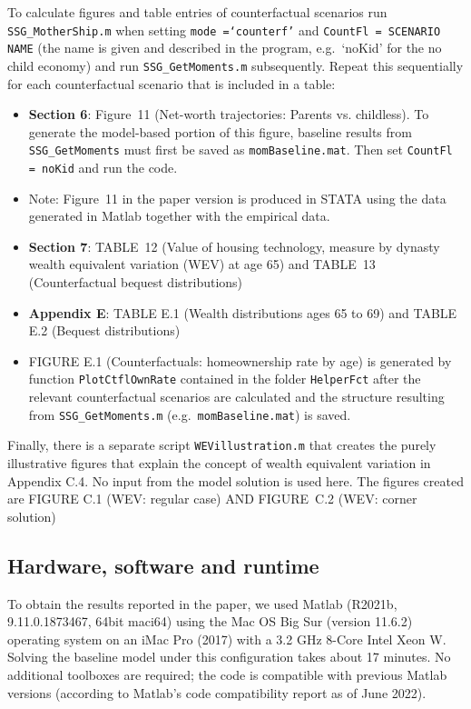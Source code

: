 \documentclass[a4,12p]{article}
\begin{document}
To calculate figures and table entries of counterfactual scenarios run \texttt{SSG\_MotherShip.m} when setting \texttt{mode =`counterf'} and \texttt{CountFl = SCENARIO NAME} (the name is given and described in the program, e.g.~`noKid' for the no child economy) and run \texttt{SSG\_GetMoments.m} subsequently. Repeat this sequentially for each counterfactual scenario that is included in a table:

\begin{itemize}
\item \textbf{Section 6}: Figure~11 (Net-worth trajectories: Parents vs. childless). To generate the model-based portion of this figure, baseline results from \texttt{SSG\_GetMoments} must first be saved as \texttt{momBaseline.mat}. Then set \texttt{CountFl = noKid} and run the code.
\item[] Note: Figure~11 in the paper version is produced in STATA using the data generated in Matlab together with the empirical data.

\item \textbf{Section 7}: TABLE~12 (Value of housing technology, measure by dynasty wealth equivalent variation (WEV) at age 65) and TABLE~13 (Counterfactual bequest distributions)

\item \textbf{Appendix E}: TABLE E.1 (Wealth distributions ages 65 to 69) and TABLE E.2 (Bequest distributions)
\item[] FIGURE E.1 (Counterfactuals: homeownership rate by age) is generated by function \texttt{PlotCtflOwnRate} contained in the folder \texttt{HelperFct} after the relevant counterfactual scenarios are calculated and the structure resulting from \texttt{SSG\_GetMoments.m} (e.g.\ \texttt{momBaseline.mat}) is saved.
	\end{itemize} 

Finally, there is a separate script {\tt WEVillustration.m} that creates the purely illustrative figures that explain the concept of wealth equivalent variation in Appendix C.4. No input from the model solution is used here. 
The figures created are FIGURE C.1 (WEV: regular case) AND FIGURE~C.2 (WEV: corner solution)


\subsection{Hardware, software and runtime}
\label{sec:hardw-softw-used}

To obtain the results reported in the paper, we used Matlab (R2021b,
9.11.0.1873467, 64bit maci64) using the Mac OS Big Sur (version
11.6.2) operating system on an iMac Pro (2017) with a 3.2 GHz
8-Core Intel Xeon W. Solving the baseline model under this configuration
takes about 17 minutes. No additional toolboxes are required; the code is compatible with previous Matlab versions (according to Matlab's code compatibility report as of June 2022).
\end{document}
